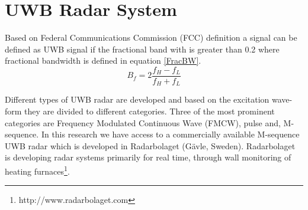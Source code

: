 \section{UWB Radar System}
Based on Federal Communications Commission (FCC) definition a signal can be defined as UWB signal if the fractional band with is greater than 0.2 where fractional bandwidth is defined in equation \ref{FracBW}.
\begin{equation}\label{FracBW}
	B_{f} = 2\frac{f_{H}-f_{L}}{f_{H}+f_{L}}
\end{equation}

Different types of UWB radar are developed and based on the excitation wave-form they are divided to different categories. Three of the most prominent categories are Frequency Modulated Continuous Wave (FMCW), pulse and, M-sequence. In this research we have access to a commercially available M-sequence UWB radar which is developed in Radarbolaget (G\"{a}vle, Sweden). Radarbolaget is developing radar systems primarily for real time, through wall monitoring of heating furnaces\footnote{http://www.radarbolaget.com}.

